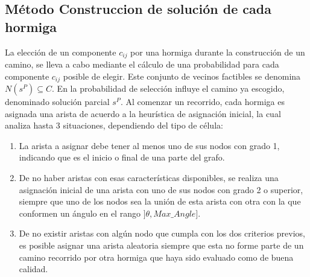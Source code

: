 \subsection{M\'etodo Construccion de soluci\'on de cada hormiga}
\label{subsubsec:antTourInit}
La elecci\'on de un componente $c_{ij}$ por una hormiga durante la construcci\'on de un camino, se lleva a cabo mediante el c\'alculo de una probabilidad para cada componente $c_{ij}$ posible de elegir. Este conjunto de vecinos factibles se denomina $N(s^{P}) \subseteq C$. En la probabilidad de selecci\'on influye el camino ya escogido, denominado soluci\'on parcial $s^{P}$. Al comenzar un recorrido, cada hormiga es asignada una arista de acuerdo a la heur\'istica de asignaci\'on inicial, la cual analiza hasta 3 situaciones, dependiendo del tipo de c\'elula:
\begin{enumerate}
\item La arista a asignar debe tener al menos uno de sus nodos con grado 1, indicando que es el inicio o final de una parte del grafo.

\item De no haber aristas con esas caracter\'isticas disponibles, se realiza una asignaci\'on inicial de una arista con uno de sus nodos con grado 2 o superior, siempre que uno de los nodos sea la uni\'on de esta arista con otra con la que conformen un \'angulo en el rango $]\theta, Max\_Angle]$. 

\item De no existir aristas con alg\'un nodo que cumpla con los dos criterios previos, es posible asignar una arista aleatoria siempre que esta no forme parte de un camino recorrido por otra hormiga que haya sido evaluado como de buena calidad.
\end{enumerate}


